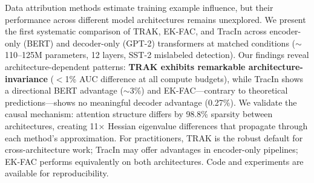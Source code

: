 Data attribution methods estimate training example influence, but their performance across different model architectures remains unexplored. We present the first systematic comparison of TRAK, EK-FAC, and TracIn across encoder-only (BERT) and decoder-only (GPT-2) transformers at matched conditions ($\sim$110--125M parameters, 12 layers, SST-2 mislabeled detection). Our findings reveal architecture-dependent patterns: \textbf{TRAK exhibits remarkable architecture-invariance} ($<$1\% AUC difference at all compute budgets), while TracIn shows a directional BERT advantage ($\sim$3\%) and EK-FAC---contrary to theoretical predictions---shows no meaningful decoder advantage (0.27\%). We validate the causal mechanism: attention structure differs by 98.8\% sparsity between architectures, creating 11$\times$ Hessian eigenvalue differences that propagate through each method's approximation. For practitioners, TRAK is the robust default for cross-architecture work; TracIn may offer advantages in encoder-only pipelines; EK-FAC performs equivalently on both architectures. Code and experiments are available for reproducibility.
